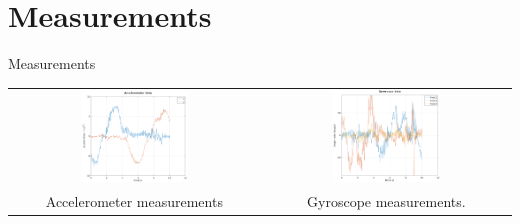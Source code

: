 \section{Measurements}

\begin{frame}{Measurements}
\begin{center}
\begin{tabular}{cc}
\includegraphics[width=0.45\textwidth]{figures/acc_data.png} & 
\includegraphics[width=0.45\textwidth]{figures/gyro_data.png} \\
Accelerometer measurements & Gyroscope measurements.
\end{tabular}
\end{center}
\end{frame}

